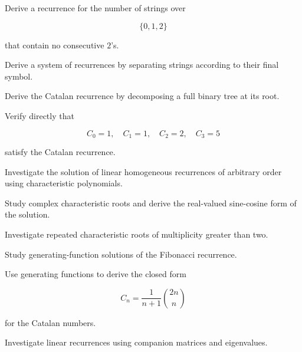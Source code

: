 \begin{exercise}[3]
Derive a recurrence for the number of strings over

\[
\{0,1,2\}
\]

that contain no consecutive \(2\)'s.
\end{exercise}

\begin{exercise}[3]
Derive a system of recurrences by separating strings according to their
final symbol.
\end{exercise}

\begin{exercise}[3]
Derive the Catalan recurrence by decomposing a full binary tree at its
root.
\end{exercise}

\begin{exercise}[3]
Verify directly that

\[
C_0=1,
\quad
C_1=1,
\quad
C_2=2,
\quad
C_3=5
\]

satisfy the Catalan recurrence.
\end{exercise}

\begin{exercise}[4]
Investigate the solution of linear homogeneous recurrences of arbitrary
order using characteristic polynomials.
\end{exercise}

\begin{exercise}[4]
Study complex characteristic roots and derive the real-valued
sine-cosine form of the solution.
\end{exercise}

\begin{exercise}[4]
Investigate repeated characteristic roots of multiplicity greater than
two.
\end{exercise}

\begin{exercise}[4]
Study generating-function solutions of the Fibonacci recurrence.
\end{exercise}

\begin{exercise}[4]
Use generating functions to derive the closed form

\[
C_n=\frac1{n+1}\binom{2n}{n}
\]

for the Catalan numbers.
\end{exercise}

\begin{exercise}[4]
Investigate linear recurrences using companion matrices and eigenvalues.
\end{exercise}

